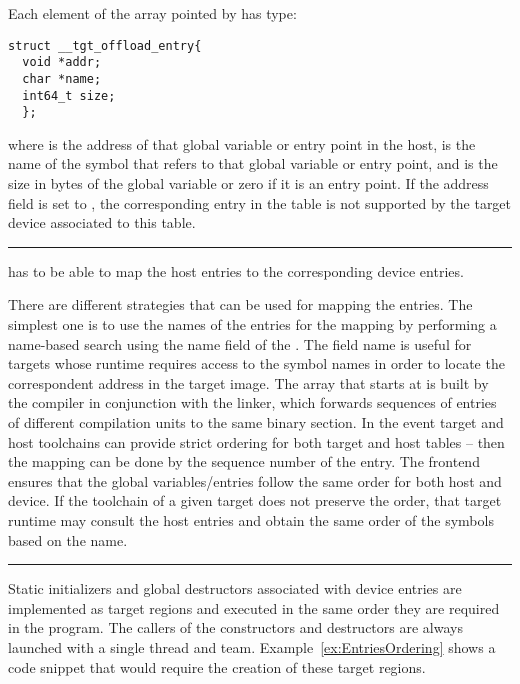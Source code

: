 Each element of the array pointed by  has type:
\begin{lstlisting}
struct __tgt_offload_entry{
  void *addr;
  char *name;
  int64_t size;
  };
\end{lstlisting}
%
where  is the address of that global variable or entry point in the host,  is the name of the 
symbol that refers to that global variable or entry point, and  is the size in bytes of the global variable or zero if it is an entry point. If the address field is set to , the corresponding entry in the table is not supported by the target device associated to this table.

\noindent\rule{\textwidth}{0.4pt}

\libomptarget{} has to be able to map the host entries to the corresponding device entries.

There are different strategies that can be used for mapping the entries. The simplest one is to use the names of the entries for the mapping by performing a name-based search using the name field of the . The field name is useful for targets whose runtime requires access to the symbol names in order to locate the correspondent address in the target image. The array that starts at  is built by the compiler in conjunction with the linker, which forwards sequences of entries of different compilation units to the same binary section. In the event target and host toolchains can provide strict ordering for both target and host tables – then the mapping can be done by the sequence number of the entry. The frontend ensures that the global variables/entries follow the same order for both host and device. If the toolchain of a given target does not preserve the order, that target runtime may consult the host entries and obtain the same order of the symbols based on the name.

\noindent\rule{\textwidth}{0.4pt}

Static initializers and global destructors associated with device entries are implemented as target regions and executed in the same order they are required in the program. The callers of the constructors and destructors are always launched with a single thread and team. Example~\ref{ex:EntriesOrdering} shows a code snippet that would require the creation of these target regions.

